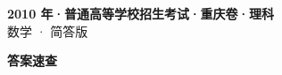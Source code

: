 \documentclass[zihao=-4, a4paper]{ctexart}
\begin{document}
\begin{center}
  {\Large\bfseries 2010 年·普通高等学校招生考试·重庆卷·理科}\\[4pt]
  {\large 数学 · 简答版}
\end{center}
\medskip
{}

\clearpage
{}
\begin{center}{\Large\bfseries 答案速查}\end{center}
\medskip

\end{document}
